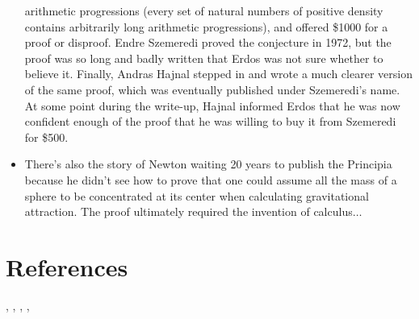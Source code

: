 \begin{editingnotes}
\begin{itemize}
arithmetic progressions (every set of natural numbers of positive density 
contains arbitrarily long arithmetic progressions), and offered \$1000 for a
proof or disproof.  Endre Szemeredi proved the conjecture in 1972, but
the proof was so long and badly written that Erdos was not sure whether
to believe it.  Finally, Andras Hajnal stepped in and wrote a much clearer
version of the same proof, which was eventually published under Szemeredi's
name.  At some point during the write-up, Hajnal informed Erdos that
he was now confident enough of the proof that he was willing to buy it 
from Szemeredi for \$500.
\item  There's also the story of Newton waiting 20 years to publish
the Principia because he didn't see how to prove that one could assume all
the mass of a sphere to be concentrated at its center when calculating
gravitational attraction.  The proof ultimately required the invention 
of calculus$\ldots$

\end{itemize}
\end{editingnotes}

\section{References}

\cite{Cupillari12}, \cite{AignerG99}, \cite{Velleman1994}, \cite{Fagin1995}, \cite{Gelfond34}

\endinput
